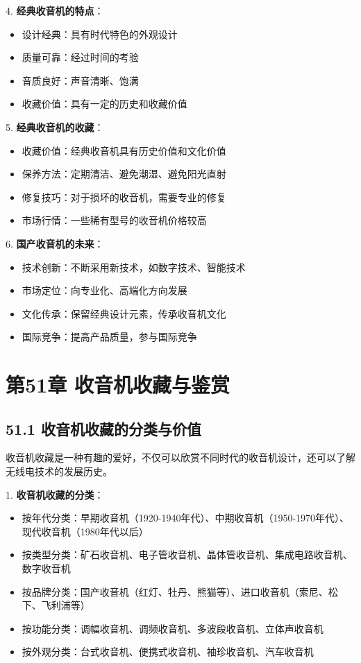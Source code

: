 \documentclass[12pt,UTF8]{ctexbook}
\begin{document}
4. \textbf{经典收音机的特点}：
   \begin{itemize}[leftmargin=3.5em]
   \item 设计经典：具有时代特色的外观设计
   \item 质量可靠：经过时间的考验
   \item 音质良好：声音清晰、饱满
   \item 收藏价值：具有一定的历史和收藏价值
   \end{itemize}

5. \textbf{经典收音机的收藏}：
   \begin{itemize}[leftmargin=3.5em]
   \item 收藏价值：经典收音机具有历史价值和文化价值
   \item 保养方法：定期清洁、避免潮湿、避免阳光直射
   \item 修复技巧：对于损坏的收音机，需要专业的修复
   \item 市场行情：一些稀有型号的收音机价格较高
   \end{itemize}

6. \textbf{国产收音机的未来}：
   \begin{itemize}[leftmargin=3.5em]
   \item 技术创新：不断采用新技术，如数字技术、智能技术
   \item 市场定位：向专业化、高端化方向发展
   \item 文化传承：保留经典设计元素，传承收音机文化
   \item 国际竞争：提高产品质量，参与国际竞争
   \end{itemize}

\chapter*{第51章 收音机收藏与鉴赏}
\section*{51.1 收音机收藏的分类与价值}

收音机收藏是一种有趣的爱好，不仅可以欣赏不同时代的收音机设计，还可以了解无线电技术的发展历史。

1. \textbf{收音机收藏的分类}：
   \begin{itemize}[leftmargin=3.5em]
   \item 按年代分类：早期收音机（1920-1940年代）、中期收音机（1950-1970年代）、现代收音机（1980年代以后）
   \item 按类型分类：矿石收音机、电子管收音机、晶体管收音机、集成电路收音机、数字收音机
   \item 按品牌分类：国产收音机（红灯、牡丹、熊猫等）、进口收音机（索尼、松下、飞利浦等）
   \item 按功能分类：调幅收音机、调频收音机、多波段收音机、立体声收音机
   \item 按外观分类：台式收音机、便携式收音机、袖珍收音机、汽车收音机
   \end{itemize}
\end{document}
